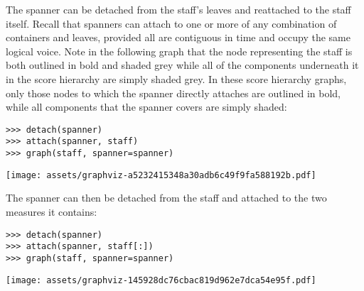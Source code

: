 \noindent The spanner can be detached from the staff's leaves and reattached to
the staff itself. Recall that spanners can attach to one or more of any
combination of containers and leaves, provided all are contiguous in time and
occupy the same logical voice. Note in the following graph that the node
representing the staff is both outlined in bold and shaded grey while all of
the components underneath it in the score hierarchy are simply shaded grey. In
these score hierarchy graphs, only those nodes to which the spanner directly
attaches are outlined in bold, while all components that the spanner
covers are simply shaded:

\begin{comment}
<abjad>
detach(spanner)
attach(spanner, staff)
graph(staff, spanner=spanner)
</abjad>
\end{comment}

\begin{abjadbookoutput}
\begin{singlespacing}
\vspace{-0.5\baselineskip}
\begin{verbatim}
>>> detach(spanner)
>>> attach(spanner, staff)
>>> graph(staff, spanner=spanner)
\end{verbatim}
\noindent\texttt{[image: assets/graphviz-a5232415348a30adb6c49f9fa588192b.pdf]}
\end{singlespacing}
\end{abjadbookoutput}

\noindent The spanner can then be detached from the staff and attached to the
two measures it contains:

\begin{comment}
<abjad>
detach(spanner)
attach(spanner, staff[:])
graph(staff, spanner=spanner)
</abjad>
\end{comment}

\begin{abjadbookoutput}
\begin{singlespacing}
\vspace{-0.5\baselineskip}
\begin{verbatim}
>>> detach(spanner)
>>> attach(spanner, staff[:])
>>> graph(staff, spanner=spanner)
\end{verbatim}
\noindent\texttt{[image: assets/graphviz-145928dc76cbac819d962e7dca54e95f.pdf]}
\end{singlespacing}
\end{abjadbookoutput}

